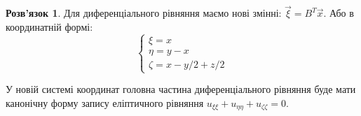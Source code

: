 \documentclass[a4paper, 12pt]{article}
\theoremstyle{definition}
\newtheorem*{solution*}{Розв'язок}
\begin{document}
\begin{solution*}
	Для диференціального рівняння маємо нові змінні: $\vec \xi = B^T \vec x$. Або в координатній формі: \[ \left\{ \begin{matrix} \xi = x \\ \eta = y - x \\ \zeta = x - y / 2 + z / 2 \end{matrix} \right. \]

	У новій системі координат головна частина диференціального рівняння буде мати канонічну форму запису еліптичного рівняння $u_{\xi\xi} + u_{\eta\eta} + u_{\zeta\zeta} = 0$.
\end{solution*}
\end{document}
